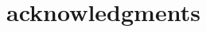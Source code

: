 \documentclass[usenatbib, letters]{mnras}
\begin{document}
\section*{acknowledgments}


%




\end{document}
